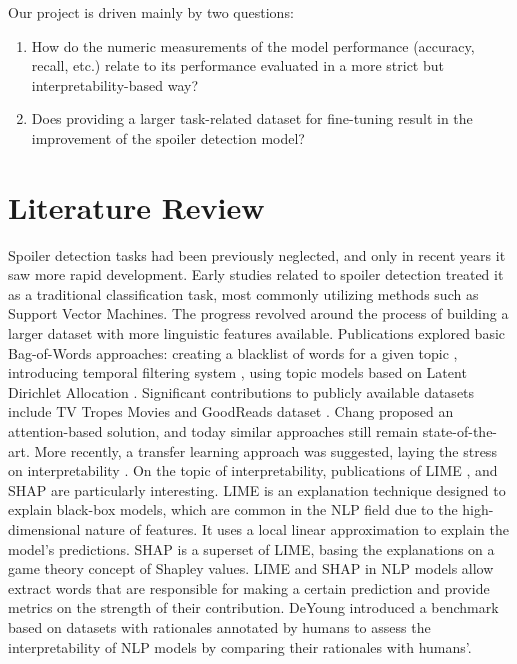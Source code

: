 \documentclass[11pt]{article}
\begin{document}
Our project is driven mainly by two questions: 
\begin{enumerate}
    \item How do the numeric measurements of the model performance (accuracy, recall, etc.) relate to its performance evaluated in a more strict but interpretability-based way?
    \item Does providing a larger task-related dataset for fine-tuning result in the improvement of the spoiler detection model?
\end{enumerate}

\section{Literature Review} \label{literature-review}

Spoiler detection tasks had been previously neglected, and only in recent years it saw more rapid development. Early studies related to spoiler detection treated it as a traditional classification task, most commonly utilizing methods such as Support Vector Machines. The progress revolved around the process of building a larger dataset with more linguistic features available. Publications explored basic Bag-of-Words approaches: creating a blacklist of words for a given topic \cite{golbeck2012twitter}, introducing temporal filtering system \cite{nakamura2007temporal}, using topic models based on Latent Dirichlet Allocation \cite{guo2010finding}. Significant contributions to publicly available datasets include TV Tropes Movies \cite{boyd2013spoiler} and GoodReads dataset \cite{wan2019fine}. Chang  proposed an attention-based solution, and today similar approaches still remain state-of-the-art. More recently, a transfer learning approach was suggested, laying the stress on interpretability \cite{wroblewska2021spoiler}. On the topic of interpretability, publications of LIME \cite{lime}, and SHAP \cite{NIPS2017_7062} are particularly interesting. LIME is an explanation technique designed to explain black-box models, which are common in the NLP field due to the high-dimensional nature of features. It uses a local linear approximation to explain the model's predictions. SHAP is a superset of LIME, basing the explanations on a game theory concept of Shapley values. LIME and SHAP in NLP models allow extract words that are responsible for making a certain prediction and provide metrics on the strength of their contribution. DeYoung  introduced a benchmark based on datasets with rationales annotated by humans to assess the interpretability of NLP models by comparing their rationales with humans'.
\end{document}
